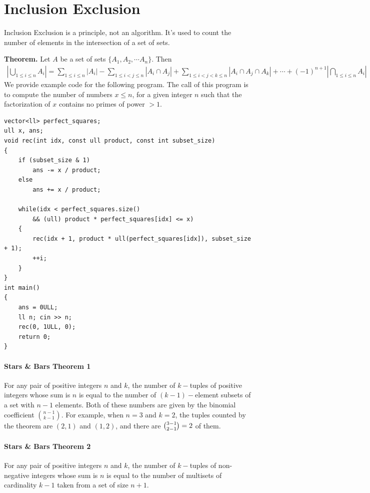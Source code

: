 \documentclass[12pt]{book}
\begin{document}
\section{Inclusion Exclusion}
Inclusion Exclusion is a principle, not an algorithm. It's used to count the number of elements in the intersection of a set of sets.

\textbf{Theorem. }Let $A$ be a set of sets $\{A_1, A_2, \cdots A_n\}$. Then
\begin{align*}
|\bigcup\limits_{1 \leq i \leq n} A_i| = \sum\limits_{1 \leq i \leq n} |A_i| - \sum\limits_{1 \leq i < j\leq n}|A_i \cap A_j| + \sum\limits_{1 \leq i < j < k \leq n}|A_i \cap A_j \cap A_k| + \cdots + (-1)^{n + 1}|\bigcap\limits_{1 \leq i \leq n} A_i|
\end{align*}
We provide example code for the following program. The call of this program is to compute the number of numbers $x \leq n$, for a given integer $n$ such that the factorization of $x$ contains no primes of power $> 1$.
\begin{verbatim}
vector<ll> perfect_squares;
ull x, ans;
void rec(int idx, const ull product, const int subset_size)
{
	if (subset_size & 1)
		ans -= x / product;
	else
		ans += x / product;
	
	while(idx < perfect_squares.size()
		&& (ull) product * perfect_squares[idx] <= x)
	{
		rec(idx + 1, product * ull(perfect_squares[idx]), subset_size + 1);
		++i;
	}
}
int main()
{
	ans = 0ULL;
	ll n; cin >> n;
	rec(0, 1ULL, 0);
	return 0;
}
\end{verbatim}
\paragraph{Stars \& Bars Theorem 1}
For any pair of positive integers $n$ and $k$, the number of $k-$tuples of positive integers whose sum is $n$ is equal to the number of $(k-1)-$element subsets of a set with $n-1$ elements.
Both of these numbers are given by the binomial coefficient ${n-1 \choose k-1}$. For example, when $n = 3$ and $k = 2$, the tuples counted by the theorem are $(2, 1)$ and $(1, 2)$, and there are $\tbinom {3-1}{2-1} = 2$ of them.

\paragraph{Stars \& Bars Theorem 2}
For any pair of positive integers $n$ and $k$, the number of $k-$tuples of non-negative integers whose sum is $n$ is equal to the number of multisets of cardinality $k-1$ taken from a set of size $n + 1$.
\end{document}
